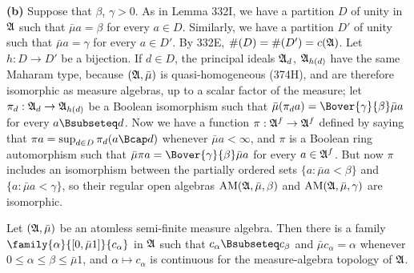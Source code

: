 {\medskip

{\bf (b)} Suppose that $\beta$, $\gamma>0$.   As in Lemma 332I, we have a
partition $D$ of unity in $\frak A$ such that $\bar\mu a=\beta$ for
every $a\in D$.   Similarly, we have a partition $D'$ of unity such that
$\bar\mu a=\gamma$ for every $a\in D'$.   By 332E,
$\#(D)=\#(D')=c(\frak A)$.   Let $h:D\to D'$ be a bijection.   If $d\in D$,
the principal ideals $\frak A_d$, $\frak A_{h(d)}$ have the same
Maharam type, because $(\frak A,\bar\mu)$ is quasi-homogeneous (374H),
and are therefore isomorphic as measure algebras, up to a
scalar factor of the measure;  let $\pi_d:\frak A_d\to\frak A_{h(d)}$ be
a Boolean isomorphism such that
$\bar\mu(\pi_da)=\Bover{\gamma}{\beta}\bar\mu a$ for every
$a\Bsubseteq d$.   Now we have a function $\pi:\frak A^f\to\frak A^f$
defined by saying that $\pi a=\sup_{d\in D}\pi_d(a\Bcap d)$ whenever
$\bar\mu a<\infty$, and $\pi$ is a Boolean ring automorphism such that
$\bar\mu\pi a=\Bover{\gamma}{\beta}\bar\mu a$ for every $a\in\frak A^f$.
But now $\pi$ includes an isomorphism between the partially ordered sets
$\{a:\bar\mu a<\beta\}$ and $\{a:\bar\mu a<\gamma\}$, so their regular
open algebras $\mathop{\text{AM}}(\frak A,\bar\mu,\beta)$ and
$\mathop{\text{AM}}(\frak A,\bar\mu,\gamma)$ are isomorphic.
}%

Let $(\frak A,\bar\mu)$ be an atomless semi-finite
measure algebra.   Then there is a family
$\family{\alpha}{[0,\bar\mu 1]}{c_{\alpha}}$ in $\frak A$ such that
$c_{\alpha}\Bsubseteq c_{\beta}$ and $\bar\mu c_{\alpha}=\alpha$
whenever $0\le\alpha\le\beta\le\bar\mu 1$,
and $\alpha\mapsto c_{\alpha}$ is continuous for
the measure-algebra topology of $\frak A$.


